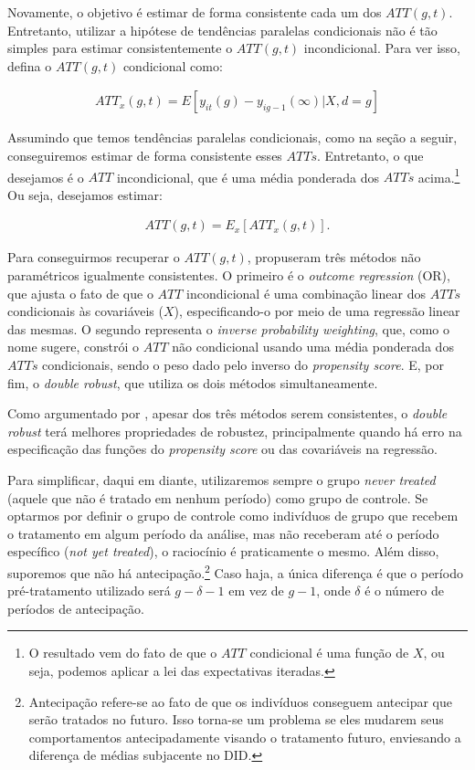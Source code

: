 \documentclass[portugues]{article}
\begin{document}
Novamente, o objetivo é estimar de forma consistente cada um dos $ATT(g,t)$. Entretanto, utilizar a hipótese de tendências paralelas condicionais não é tão simples para estimar consistentemente o $ATT(g,t)$ incondicional. Para ver isso, defina o $ATT(g,t)$ condicional como:

\[
\begin{split}
    ATT_x(g,t) = E[y_{it}(g) - y_{ig-1}(\infty) | X, d = g]
\end{split}
\]

Assumindo que temos tendências paralelas condicionais, como na seção a seguir, conseguiremos estimar de forma consistente esses $ATTs$. Entretanto, o que desejamos é o $ATT$ incondicional, que é uma média ponderada dos $ATTs$ acima.\footnote{O resultado vem do fato de que o $ATT$ condicional é uma função de $X$, ou seja, podemos aplicar a lei das expectativas iteradas.} Ou seja, desejamos estimar:

\[
\begin{split}
    ATT(g,t) = E_{x}[ATT_x(g,t)].
\end{split}
\]

Para conseguirmos recuperar o $ATT(g,t)$, \cite{callaway2021difference} propuseram três métodos não paramétricos igualmente consistentes. O primeiro é o \textit{outcome regression} (OR), que ajusta o fato de que o $ATT$ incondicional é uma combinação linear dos $ATTs$ condicionais às covariáveis ($X$), especificando-o por meio de uma regressão linear das mesmas. O segundo representa o \textit{inverse probability weighting}, que, como o nome sugere, constrói o $ATT$ não condicional usando uma média ponderada dos $ATTs$ condicionais, sendo o peso dado pelo inverso do \textit{propensity score}. E, por fim, o \textit{double robust}, que utiliza os dois métodos simultaneamente.

Como argumentado por \cite{callaway2021difference}, apesar dos três métodos serem consistentes, o \textit{double robust} terá melhores propriedades de robustez, principalmente quando há erro na especificação das funções do \textit{propensity score} ou das covariáveis na regressão.

Para simplificar, daqui em diante, utilizaremos sempre o grupo\textit{ never treated} (aquele que não é tratado em nenhum período) como grupo de controle. Se optarmos por definir o grupo de controle como indivíduos de grupo que recebem o tratamento em algum período da análise, mas não receberam até o período específico (\textit{not yet treated}), o raciocínio é praticamente o mesmo. Além disso, suporemos que não há antecipação.\footnote{Antecipação refere-se ao fato de que os indivíduos conseguem antecipar que serão tratados no futuro. Isso torna-se um problema se eles mudarem seus comportamentos antecipadamente visando o tratamento futuro, enviesando a diferença de médias subjacente no DID.}
Caso haja, a única diferença é que o período pré-tratamento utilizado será $g-\delta-1$ em vez de $g-1$, onde $\delta$ é o número de períodos de antecipação.
\end{document}
